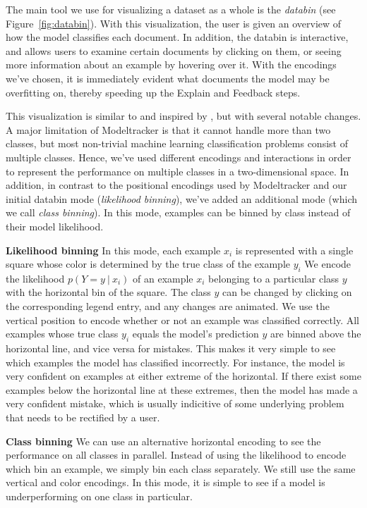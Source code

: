 \documentclass{chi2009}
\begin{document}
The main tool we use for visualizing a dataset as a whole is the
\textit{databin} (see Figure~\ref{fig:databin}). With this visualization, the
user is given an overview of how the model classifies each document. In
addition, the databin is interactive, and allows users to examine certain
documents by clicking on them, or seeing more information about an example by
hovering over it. With the encodings we've chosen, it is immediately evident
what documents the model may be overfitting on, thereby speeding up the Explain
and Feedback steps.

This visualization is similar to and inspired by \cite{modeltracker}, but with
several notable changes. A major limitation of Modeltracker is that it cannot
handle more than two classes, but most non-trivial machine learning
classification problems consist of multiple classes. Hence, we've used different
encodings and interactions in order to represent the performance on multiple
classes in a two-dimensional space. In addition, in contrast to the positional
encodings used by Modeltracker and our initial databin mode (\textit{likelihood
binning}), we've added an additional mode (which we call \textit{class
binning}). In this mode, examples can be binned by class instead of their model
likelihood. 

\textbf{Likelihood binning} In this mode, each example $x_i$ is represented with
a single square whose color is determined by the true class of the example $y_i$
We encode the likelihood $p(Y=y\ |\ x_i)$ of an example $x_i$ belonging to a
particular class $y$ with the horizontal bin of the square. The class $y$
can be changed by clicking on the corresponding legend entry, and any changes
are animated. We use the vertical position to encode whether or not an example
was classified correctly. All examples whose true class $y_i$ equals the model's
prediction $y$ are binned above the horizontal line, and vice versa for
mistakes. This makes it very simple to see which examples the model has
classified incorrectly. For instance, the model is very confident on examples at
either extreme of the horizontal. If there exist some examples below the
horizontal line at these extremes, then the model has made a very confident
mistake, which is usually indicitive of some underlying problem that needs to be
rectified by a user.

\textbf{Class binning} We can use an alternative horizontal encoding to see the
performance on all classes in parallel. Instead of using the likelihood to
encode which bin an example, we simply bin each class separately. We still use
the same vertical and color encodings. In this mode, it is simple to see if a
model is underperforming on one class in particular.
\end{document}
